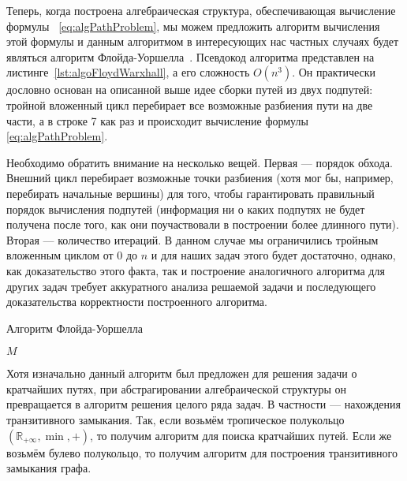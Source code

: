 Теперь, когда построена алгебраическая структура, обеспечивающая вычисление формулы~
\ref{eq:algPathProblem}, мы можем предложить алгоритм вычисления этой формулы и данным алгоритмом в интересующих нас частных случаях будет являться алгоритм Флойда-Уоршелла~\cite{Floyd1962, Bernard1959, Warshall1962}. Псевдокод алгоритма представлен на листинге~\ref{lst:algoFloydWarxhall}, а его сложность $O(n^3)$. Он практически дословно основан на описанной выше идее сборки путей из двух подпутей: тройной вложенный цикл перебирает все возможные разбиения пути на две части, а в строке 7 как раз и происходит вычисление формулы~
\ref{eq:algPathProblem}.

Необходимо обратить внимание на несколько вещей. Первая --- порядок обхода. Внешний цикл перебирает возможные точки разбиения (хотя мог бы, например, перебирать начальные вершины) для того, чтобы гарантировать правильный порядок вычисления подпутей (информация ни о каких подпутях не будет получена после того, как они поучаствовали в построении более длинного пути). Вторая --- количество итераций. В данном случае мы ограничились тройным вложенным циклом от 0 до $n$ и для наших задач этого будет достаточно, однако, как доказательство этого факта, так и построение аналогичного алгоритма для других задач требует аккуратного анализа решаемой задачи и последующего доказательства корректности построенного алгоритма.

\begin{algorithm}
\begin{algorithmic}[1]
\caption{Алгоритм Флойда-Уоршелла}
\label{lst:algoFloydWarxhall}
        \EndFor
      \EndFor
    \EndFor
\State \Return $M$
\EndFunction
\end{algorithmic}
\end{algorithm}

Хотя изначально данный алгоритм был предложен для решения задачи о кратчайших путях, при абстрагировании алгебраической структуры он превращается в алгоритм решения целого ряда задач. В частности --- нахождения транзитивного замыкания. Так, если возьмём тропическое полукольцо $(\mathbb{R}_{+\infty}, \min, +)$, то получим алгоритм для поиска кратчайших путей. Если же возьмём булево полукольцо, то получим алгоритм для построения транзитивного замыкания графа.

